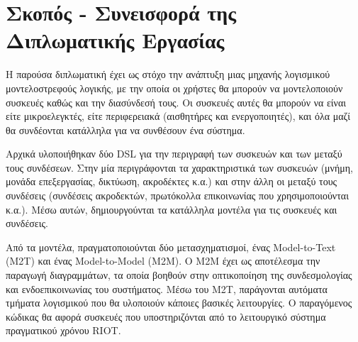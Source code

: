 \section{Σκοπός - Συνεισφορά της Διπλωματικής Εργασίας}
\label{section:contribution}

Η παρούσα διπλωματική έχει ως στόχο την ανάπτυξη μιας μηχανής λογισμικού μοντελοστρεφούς λογικής, με την οποία οι χρήστες θα μπορούν να μοντελοποιούν συσκευές καθώς και την διασύνδεσή τους. Οι συσκευές αυτές θα μπορούν να είναι είτε μικροελεγκτές, είτε περιφερειακά (αισθητήρες και ενεργοποιητές), και όλα μαζί θα συνδέονται κατάλληλα για να συνθέσουν ένα σύστημα.

Αρχικά υλοποιήθηκαν δύο DSL για την περιγραφή των συσκευών και των μεταξύ τους συνδέσεων. Στην μία περιγράφονται τα χαρακτηριστικά των συσκευών (μνήμη, μονάδα επεξεργασίας, δικτύωση, ακροδέκτες κ.α.) και στην άλλη οι μεταξύ τους συνδέσεις (συνδέσεις ακροδεκτών, πρωτόκολλα επικοινωνίας που χρησιμοποιούνται κ.α.). Μέσω αυτών, δημιουργούνται τα κατάλληλα μοντέλα για τις συσκευές και συνδέσεις.

Από τα μοντέλα, πραγματοποιούνται δύο μετασχηματισμοί, ένας Model-to-Text (M2T) και ένας Model-to-Model (M2M). Ο M2M έχει ως αποτέλεσμα την παραγωγή διαγραμμάτων, τα οποία βοηθούν στην οπτικοποίηση της συνδεσμολογίας και ενδοεπικοινωνίας του συστήματος. Μέσω του M2T, παράγονται αυτόματα τμήματα λογισμικού που θα υλοποιούν κάποιες βασικές λειτουργίες. Ο παραγόμενος κώδικας θα αφορά συσκευές που υποστηριζόνται από το λειτουργικό σύστημα πραγματικού χρόνου RIOT.
